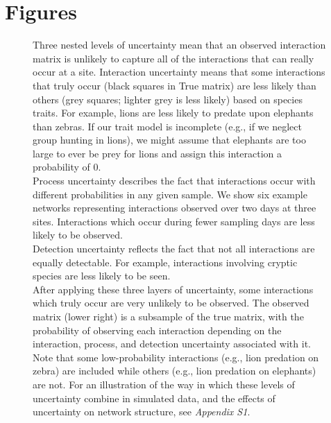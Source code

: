 \documentclass[12pt]{article}
\begin{document}

\section*{Figures}

  \begin{figure}[h!]
    \caption{Three nested levels of uncertainty mean that an observed interaction matrix is unlikely to capture all of the interactions that can really occur at a site. Interaction uncertainty means that some interactions that truly occur (black squares in True matrix) are less likely than others (grey squares; lighter grey is less likely) based on species traits. For example, lions are less likely to predate upon elephants than zebras. If our trait model is incomplete (e.g., if we neglect group hunting in lions), we might assume that elephants are too large to ever be prey for lions and assign this interaction a probability of 0.\\
    \indent Process uncertainty describes the fact that interactions occur with different probabilities in any given sample. We show six example networks representing interactions observed over two days at three sites. Interactions which occur during fewer sampling days are less likely to be observed.\\
    \indent Detection uncertainty reflects the fact that not all interactions are equally detectable. For example, interactions involving cryptic species are less likely to be seen.\\
    \indent After applying these three layers of uncertainty, some interactions which truly occur are very unlikely to be observed. The observed matrix (lower right) is a subsample of the true matrix, with the probability of observing each interaction depending on the interaction, process, and detection uncertainty associated with it. Note that some low-probability interactions (e.g., lion predation on zebra) are included while others (e.g., lion predation on elephants) are not. For an illustration of the way in which these levels of uncertainty combine in simulated data, and the effects of uncertainty on network structure, see \emph{Appendix S1}.}
    \label{conceptual_fig}
    \begin{center}

\end{center}
\end{figure}
\end{document}
